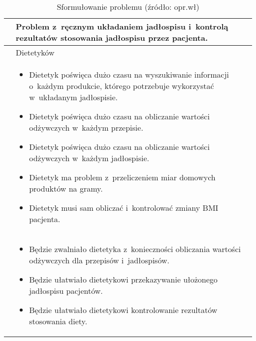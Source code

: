 \begin{minipage}{\textwidth}
    \begin{table}[H]
        \centering\caption{Sformułowanie problemu (źródło: opr.wł)\label{tabela:sformulowanie-problemu}}
        \begin{tabular}{|P{.2\textwidth}|p{.7\textwidth}|}

            \hline
             &
            Problem z~ręcznym układaniem jadłospisu i~kontrolą rezultatów stosowania jadłospisu przez pacjenta. \\
            \hline

             &
            Dietetyków \\
            \hline

             &
            \begin{itemize}
                \item Dietetyk poświęca dużo czasu na wyszukiwanie informacji o~każdym produkcie, którego potrzebuje wykorzystać w~układanym jadłospisie.
                \item Dietetyk poświęca dużo czasu na obliczanie wartości odżywczych w~każdym przepisie.
                \item Dietetyk poświęca dużo czasu na obliczanie wartości odżywczych w~każdym jadłospisie.
                \item Dietetyk ma problem z~przeliczeniem miar domowych produktów na gramy.
                \item Dietetyk musi sam obliczać i~kontrolować zmiany BMI pacjenta.
            \end{itemize} \\
            \hline

             &
            \begin{itemize}
                \item Będzie zwalniało dietetyka z~konieczności obliczania wartości odżywczych dla przepisów i~jadłospisów.
                \item Będzie ułatwiało dietetykowi przekazywanie ułożonego jadłospisu pacjentów.
                \item Będzie ułatwiało dietetykowi kontrolowanie rezultatów stosowania diety.
            \end{itemize} \\
            \hline
        \end{tabular}
    \end{table}
\end{minipage}
